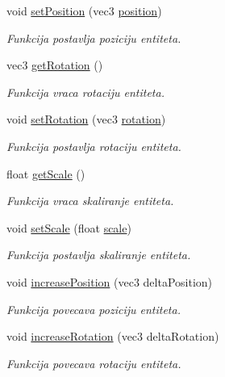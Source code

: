 \begin{DoxyCompactItemize}
void \hyperlink{classentity_1_1AnimatedEntity_a757b7e1a09af9299d807e4c5d1b1bab7}{set\+Position} (vec3 \hyperlink{classentity_1_1AnimatedEntity_ab02891959f4c1191807e267c48466230}{position})
\begin{DoxyCompactList}\small\item\em Funkcija postavlja poziciju entiteta. \end{DoxyCompactList}\item 
vec3 \hyperlink{classentity_1_1AnimatedEntity_a6dbb9afaea995f85a112f32efe7f77e8}{get\+Rotation} ()
\begin{DoxyCompactList}\small\item\em Funkcija vraca rotaciju entiteta. \end{DoxyCompactList}\item 
void \hyperlink{classentity_1_1AnimatedEntity_a170e9954b61845de9a0a6b016cc8429e}{set\+Rotation} (vec3 \hyperlink{classentity_1_1AnimatedEntity_a32f7718856950b74d40f4a96c1aa6f3d}{rotation})
\begin{DoxyCompactList}\small\item\em Funkcija postavlja rotaciju entiteta. \end{DoxyCompactList}\item 
float \hyperlink{classentity_1_1AnimatedEntity_ab50284046aa25cb7d264f9341cf904a5}{get\+Scale} ()
\begin{DoxyCompactList}\small\item\em Funkcija vraca skaliranje entiteta. \end{DoxyCompactList}\item 
void \hyperlink{classentity_1_1AnimatedEntity_aee9d22061e72c42ded0d898f43d351c3}{set\+Scale} (float \hyperlink{classentity_1_1AnimatedEntity_a137e8fe0398142e9dedebb3eb1fe4f2f}{scale})
\begin{DoxyCompactList}\small\item\em Funkcija postavlja skaliranje entiteta. \end{DoxyCompactList}\item 
void \hyperlink{classentity_1_1AnimatedEntity_a525fd1a4aaa4019d28e224323ce536ef}{increase\+Position} (vec3 delta\+Position)
\begin{DoxyCompactList}\small\item\em Funkcija povecava poziciju entiteta. \end{DoxyCompactList}\item 
void \hyperlink{classentity_1_1AnimatedEntity_adc9ba713f406ad55f2c5f0baaf3d21b4}{increase\+Rotation} (vec3 delta\+Rotation)
\begin{DoxyCompactList}\small\item\em Funkcija povecava rotaciju entiteta. \end{DoxyCompactList}\end{DoxyCompactItemize}
